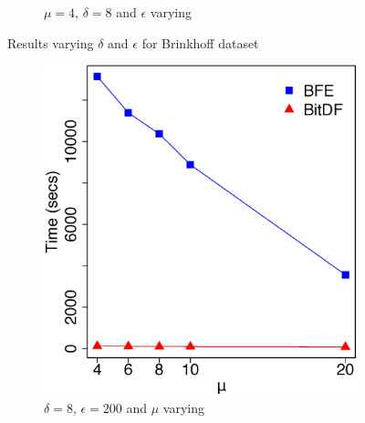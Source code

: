 {\begin{figure}[h!]
\begin{subfigure}[t]{0.48\textwidth}
        \caption{$\mu = 4$, $\delta = 8$ and $\epsilon$ varying}
        \label{fig:brinkhoff_vary_g}
    \end{subfigure}
    \caption{Results varying $\delta$ and $\epsilon$ for Brinkhoff dataset}
    \label{fig:brinkhoff_results}
\end{figure}

\begin{figure}[h!]
    \begin{subfigure}[t]{0.48\textwidth}
        \includegraphics[width=\textwidth]{images/Brinkhoff_l_8_g_200_varying_n.eps}
        \caption{$\delta = 8$, $\epsilon = 200$ and $\mu$ varying}
        \label{fig:brinkhoff_vary_n}
    \end{subfigure}
    \begin{subfigure}[t]{0.48\textwidth}

\end{subfigure}
\end{figure}}
